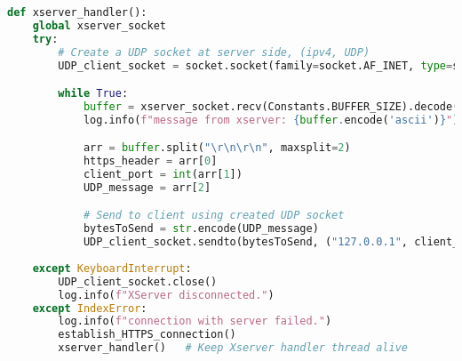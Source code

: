 \begin{latin}
\begin{lstlisting}[firstnumber=63, language=Python]
def xserver_handler():
    global xserver_socket
    try:
		# Create a UDP socket at server side, (ipv4, UDP)
        UDP_client_socket = socket.socket(family=socket.AF_INET, type=socket.SOCK_DGRAM)

        while True:
            buffer = xserver_socket.recv(Constants.BUFFER_SIZE).decode("ascii")
            log.info(f"message from xserver: {buffer.encode('ascii')}")

            arr = buffer.split("\r\n\r\n", maxsplit=2)
            https_header = arr[0]
            client_port = int(arr[1])
            UDP_message = arr[2]

			# Send to client using created UDP socket
            bytesToSend = str.encode(UDP_message)
            UDP_client_socket.sendto(bytesToSend, ("127.0.0.1", client_port))
			
    except KeyboardInterrupt:
        UDP_client_socket.close()
        log.info(f"XServer disconnected.")
    except IndexError:
        log.info(f"connection with server failed.")
        establish_HTTPS_connection()
        xserver_handler()   # Keep Xserver handler thread alive

\end{lstlisting}
\end{latin}

